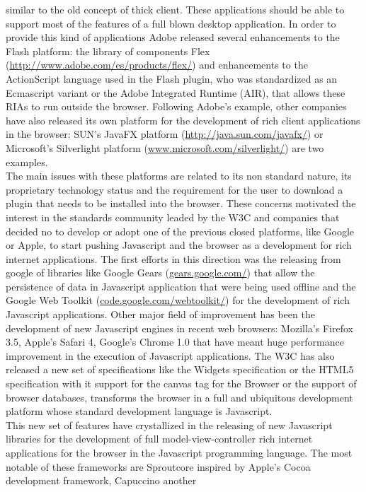 similar to the old concept of thick client. These
applications should be able to support most of the features of a full blown desktop application. In order to provide
this kind of applications Adobe released several enhancements to the Flash platform: the library of components Flex (\url{http://www.adobe.com/es/products/flex/})
and enhancements to the ActionScript language used in the Flash plugin, who was standardized as an Ecmascript variant or
the Adobe Integrated Runtime (AIR), that allows these RIAs to run outside the browser. Following Adobe's example, other
companies have also released its own platform for the development of rich client applications in the browser: SUN's
JavaFX platform (\url{http://java.sun.com/javafx/}) or Microsoft's Silverlight platform (\url{www.microsoft.com/silverlight/}) are two examples.\\ The main issues with these platforms are
related to its non standard nature, its proprietary technology status and the requirement for the user to download a plugin
that needs to be installed into the browser. These concerns motivated the interest in the standards community leaded by
the W3C and companies that decided no to develop or adopt one of the previous closed platforms, like Google or Apple, to
start pushing Javascript and the browser as a development for rich internet applications. The first efforts in this
direction was the releasing from google of libraries like Google Gears (\url{gears.google.com/}) that allow the persistence of data in
Javascript application that were being used offline and the Google Web Toolkit (\url{code.google.com/webtoolkit/}) for the development of rich
Javascript applications. Other major field of improvement has been the development of new Javascript engines in recent
web browsers: Mozilla's Firefox 3.5, Apple's Safari 4, Google's Chrome 1.0 that have meant huge performance improvement in
the execution of Javascript applications. The W3C has also released a new set of specifications like the Widgets \cite{widgetsw3c}
specification or the HTML5 specification \cite{html5} with it support for the canvas tag for the Browser  or the support of browser
databases, transforms the browser in a full and ubiquitous development platform whose standard development
language is Javascript. \\ 
This new set of features have crystallized in the releasing of new Javascript libraries for the development of full
model-view-controller rich internet applications for the browser in the Javascript programming language. The most
notable of these frameworks are Sproutcore inspired by Apple's Cocoa development framework, Capuccino another
